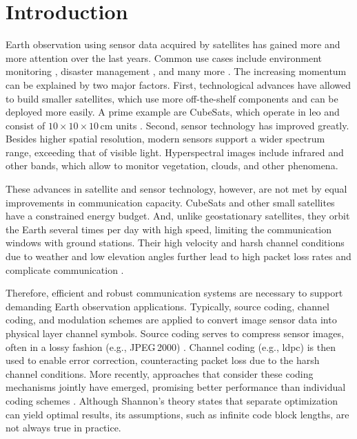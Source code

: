 \documentclass[conference]{IEEEtran}
\newcommand\jpegtwok{JPEG\,2000\xspace}
\begin{document}
\acresetall
\section{Introduction}

Earth observation using sensor data acquired by satellites has gained more and more attention over the last years.
Common use cases include environment monitoring \cite{rs14030589}, disaster management \cite{barmpoutis2020}, and many more \cite{radix,MarCO}.
The increasing momentum can be explained by two major factors.
First, technological advances have allowed to build smaller satellites, which use more off-the-shelf components and can be deployed more easily.
A prime example are CubeSats, which operate in \ac{leo} and consist of $10 \times 10 \times 10$\,cm units \cite{cubesat2020}.
Second, sensor technology has improved greatly.
Besides higher spatial resolution, modern sensors support a wider spectrum range, exceeding that of visible light.
Hyperspectral images include infrared and other bands, which allow to monitor vegetation, clouds, and other phenomena.

These advances in satellite and sensor technology, however, are not met by equal improvements in communication capacity.
CubeSats and other small satellites have a constrained energy budget.
And, unlike geostationary satellites, they orbit the Earth several times per day with high speed, limiting the communication windows with ground stations.
Their high velocity and harsh channel conditions due to weather and low elevation angles further lead to high packet loss rates and complicate communication \cite{nogales2018}.

Therefore, efficient and robust communication systems are necessary to support demanding Earth observation applications.
Typically, source coding, channel coding, and modulation schemes are applied to convert image sensor data into physical layer channel symbols.
Source coding serves to compress sensor images, often in a lossy fashion (e.g., \jpegtwok) \cite{sentinel-2-user-handbook}.
Channel coding (e.g., \ac{ldpc}) is then used to enable error correction, counteracting packet loss due to the harsh channel conditions.
More recently, approaches that consider these coding mechanisms jointly have emerged, promising better performance than individual coding schemes \cite{6408177}.
Although Shannon's theory \cite{cover1991elements} states that separate optimization can yield optimal results, its assumptions, such as infinite code block lengths, are not always true in practice.
\end{document}
